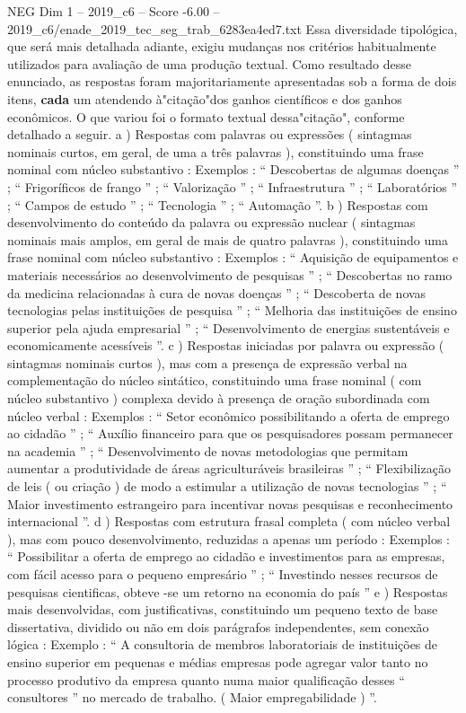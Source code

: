 \begin{textsample}{NEG Dim 1 – 2019\_c6 – Score -6.00 – 2019\_c6/enade\_2019\_tec\_seg\_trab\_6283ea4ed7.txt}
Essa diversidade tipológica, que será mais detalhada adiante, exigiu mudanças nos critérios habitualmente utilizados para avaliação de uma produção textual.
Como resultado desse enunciado, as respostas foram majoritariamente apresentadas sob a forma de dois itens, \textbf{cada} um atendendo à"citação"dos ganhos científicos e dos ganhos econômicos.
O que variou foi o formato textual dessa"citação", conforme detalhado a seguir. a ) Respostas com palavras ou expressões ( sintagmas nominais curtos, em geral, de uma a três palavras ), constituindo uma frase nominal com núcleo substantivo : Exemplos : “ Descobertas de algumas doenças ” ; “ Frigoríficos de frango ” ; “ Valorização ” ; “ Infraestrutura ” ; “ Laboratórios ” ; “ Campos de estudo ” ; “ Tecnologia ” ; “ Automação ”. b ) Respostas com desenvolvimento do conteúdo da palavra ou expressão nuclear ( sintagmas nominais mais amplos, em geral de mais de quatro palavras ), constituindo uma frase nominal com núcleo substantivo : Exemplos : “ Aquisição de equipamentos e materiais necessários ao desenvolvimento de pesquisas ” ; “ Descobertas no ramo da medicina relacionadas à cura de novas doenças ” ; “ Descoberta de novas tecnologias pelas instituições de pesquisa ” ; “ Melhoria das instituições de ensino superior pela ajuda empresarial ” ; “ Desenvolvimento de energias sustentáveis e economicamente acessíveis ”. c ) Respostas iniciadas por palavra ou expressão ( sintagmas nominais curtos ), mas com a presença de expressão verbal na complementação do núcleo sintático, constituindo uma frase nominal ( com núcleo substantivo ) complexa devido à presença de oração subordinada com núcleo verbal : Exemplos : “ Setor econômico possibilitando a oferta de emprego ao cidadão ” ; “ Auxílio financeiro para que os pesquisadores possam permanecer na academia ” ; “ Desenvolvimento de novas metodologias que permitam aumentar a produtividade de áreas agriculturáveis brasileiras ” ; “ Flexibilização de leis ( ou criação ) de modo a estimular a utilização de novas tecnologias ” ; “ Maior investimento estrangeiro para incentivar novas pesquisas e reconhecimento internacional ”. d ) Respostas com estrutura frasal completa ( com núcleo verbal ), mas com pouco desenvolvimento, reduzidas a apenas um período : Exemplos : “ Possibilitar a oferta de emprego ao cidadão e investimentos para as empresas, com fácil acesso para o pequeno empresário ” ; “ Investindo nesses recursos de pesquisas cientificas, obteve -se um retorno na economia do país ” e ) Respostas mais desenvolvidas, com justificativas, constituindo um pequeno texto de base dissertativa, dividido ou não em dois parágrafos independentes, sem conexão lógica : Exemplo : “ A consultoria de membros laboratoriais de instituições de ensino superior em pequenas e médias empresas pode agregar valor tanto no processo produtivo da empresa quanto numa maior qualificação desses “ consultores ” no mercado de trabalho. ( Maior empregabilidade ) ”.

\end{textsample}
